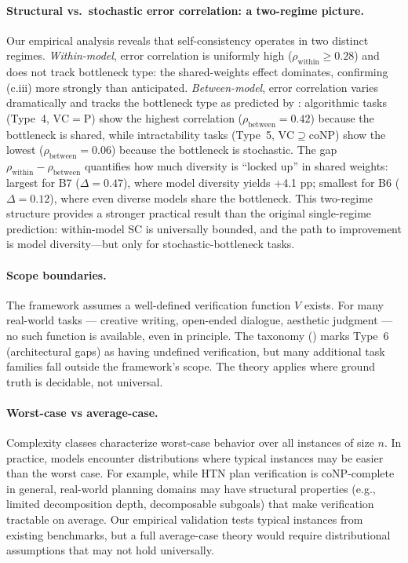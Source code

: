 \documentclass{article}
\theoremstyle{definition}
\theoremstyle{remark}
\newcommand{\PTIME}{\mathrm{P}}
\newcommand{\coNP}{\mathrm{coNP}}
\newcommand{\VC}{\mathrm{VC}}           %
\begin{document}
\paragraph{Structural vs.\ stochastic error correlation: a two-regime picture.}
Our empirical analysis reveals that self-consistency operates in two distinct regimes.
\emph{Within-model}, error correlation is uniformly high ($\rho_{\text{within}} \geq 0.28$) and does not track bottleneck type: the shared-weights effect dominates, confirming (c.iii) more strongly than anticipated.
\emph{Between-model}, error correlation varies dramatically and tracks the bottleneck type as predicted by : algorithmic tasks (Type~4, $\VC = \PTIME$) show the highest correlation ($\rho_{\text{between}} = 0.42$) because the bottleneck is shared, while intractability tasks (Type~5, $\VC \supseteq \coNP$) show the lowest ($\rho_{\text{between}} = 0.06$) because the bottleneck is stochastic.
The gap $\rho_{\text{within}} - \rho_{\text{between}}$ quantifies how much diversity is ``locked up'' in shared weights: largest for B7 ($\Delta = 0.47$), where model diversity yields +4.1 pp; smallest for B6 ($\Delta = 0.12$), where even diverse models share the bottleneck.
This two-regime structure provides a stronger practical result than the original single-regime prediction: within-model SC is universally bounded, and the path to improvement is model diversity---but only for stochastic-bottleneck tasks.

\paragraph{Scope boundaries.}
The framework assumes a well-defined verification function $V$ exists. For many real-world tasks --- creative writing, open-ended dialogue, aesthetic judgment --- no such function is available, even in principle. The taxonomy () marks Type~6 (architectural gaps) as having undefined verification, but many additional task families fall outside the framework's scope. The theory applies where ground truth is decidable, not universal.

\paragraph{Worst-case vs average-case.}
Complexity classes characterize worst-case behavior over all instances of size $n$. In practice, models encounter distributions where typical instances may be easier than the worst case. For example, while HTN plan verification is $\coNP$-complete in general, real-world planning domains may have structural properties (e.g., limited decomposition depth, decomposable subgoals) that make verification tractable on average. Our empirical validation tests typical instances from existing benchmarks, but a full average-case theory would require distributional assumptions that may not hold universally.
\end{document}
